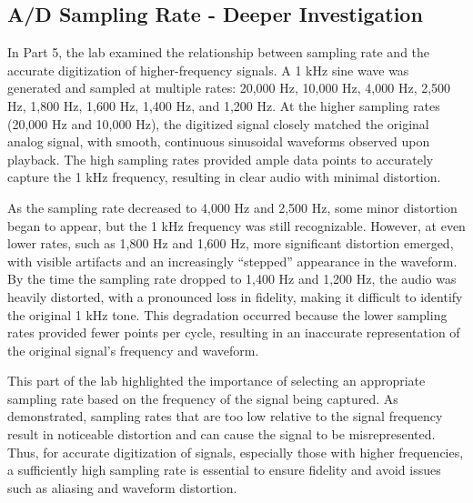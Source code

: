 \documentclass[12pt]{article}
\begin{document}
\subsection{A/D Sampling Rate - Deeper Investigation}
In Part 5, the lab examined the relationship between sampling rate and the accurate 
digitization of higher-frequency signals. A 1 kHz sine wave was generated and sampled 
at multiple rates: 20,000 Hz, 10,000 Hz, 4,000 Hz, 2,500 Hz, 1,800 Hz, 1,600 Hz, 
1,400 Hz, and 1,200 Hz. At the higher sampling rates (20,000 Hz and 10,000 Hz), the 
digitized signal closely matched the original analog signal, with smooth, continuous 
sinusoidal waveforms observed upon playback. The high sampling rates provided ample 
data points to accurately capture the 1 kHz frequency, resulting in clear audio with 
minimal distortion.
\newline

As the sampling rate decreased to 4,000 Hz and 2,500 Hz, some minor distortion began 
to appear, but the 1 kHz frequency was still recognizable. However, at even lower 
rates, such as 1,800 Hz and 1,600 Hz, more significant distortion emerged, with 
visible artifacts and an increasingly “stepped” appearance in the waveform. By the 
time the sampling rate dropped to 1,400 Hz and 1,200 Hz, the audio was heavily 
distorted, with a pronounced loss in fidelity, making it difficult to identify the 
original 1 kHz tone. This degradation occurred because the lower sampling rates 
provided fewer points per cycle, resulting in an inaccurate representation of the 
original signal’s frequency and waveform.
\newline

This part of the lab highlighted the importance of selecting an appropriate sampling 
rate based on the frequency of the signal being captured. As demonstrated, sampling 
rates that are too low relative to the signal frequency result in noticeable 
distortion and can cause the signal to be misrepresented. Thus, for accurate 
digitization of signals, especially those with higher frequencies, a sufficiently 
high sampling rate is essential to ensure fidelity and avoid issues such as aliasing 
and waveform distortion.
\newline
\end{document}
